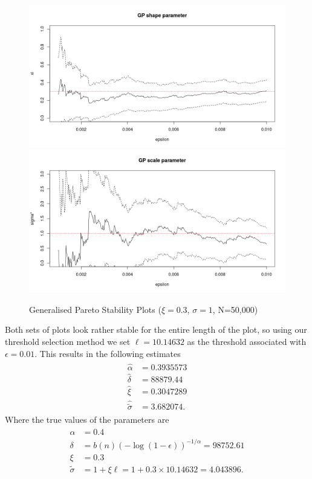\documentclass[honours,12pt,twoside, openright]{unswthesis}
\newcommand{\1}{\mathbf 1}
\numberwithin{equation}{section}
\theoremstyle{definition}
\theoremstyle{remark}
\begin{document}
\begin{figure}[h]
    \centering
    \includegraphics[width=\textwidth]{Figures/GPshape01}
    \includegraphics[width=\textwidth]{Figures/GPscale01}
    \caption{Generalised Pareto Stability Plots ($\xi=0.3$, $\sigma=1$, N=50,000)}\label{fig:GPstability}
\end{figure}
Both sets of plots look rather stable for the entire length of the plot, so using our threshold selection method we set $\ell=10.14632$ as the threshold associated with $\epsilon=0.01$. This results in the following estimates
\begin{align}
\begin{split}\label{eq:parameterEstimates}
\hat \alpha &= 0.3935573\\
\hat \delta &= 88879.44\\ 
\hat \xi &=    0.3047289\\ 
\hat {\tilde \sigma} &= 3.682074.
\end{split}
\end{align}
Where the true values of the parameters are
\begin{align}
\begin{split}\label{eq:trueValues}
 \alpha &= 0.4\\
 \delta &= b(n)(-\log(1-\epsilon))^{-1/\alpha}=98752.61 \\
 \xi &= 0.3\\
 {\tilde \sigma} &= 1+\xi\ell =1+0.3\times 10.14632 = 4.043896.
 \end{split}
\end{align} 
\end{document}
